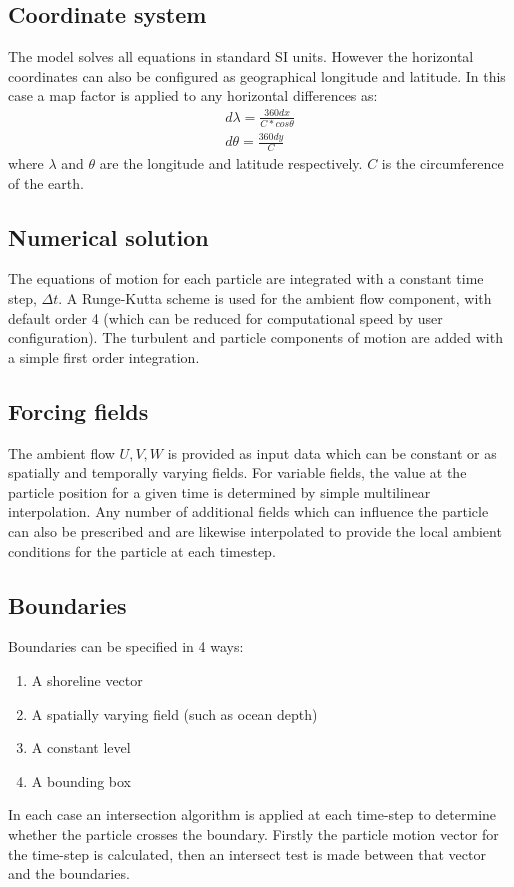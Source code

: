 \documentclass[a4paper]{article}
\begin{document}
\subsection{Coordinate system}
The model solves all equations in standard SI units.
However the horizontal coordinates can also be configured as geographical longitude and latitude.
In this case a map factor is applied to any horizontal differences as:
\begin{align}
d\lambda = \frac{360dx}{C*cos{\theta}} \\
d\theta = \frac{360dy}{C}
\end{align}
where $\lambda$ and $\theta$ are the longitude and latitude respectively. $C$ is the circumference of the earth.

\subsection{Numerical solution}
The equations of motion for each particle are integrated with a constant time step, $\Delta t$.
A Runge-Kutta scheme is used for the ambient flow component, with default order 4 (which can be reduced for computational speed by user configuration).
The turbulent and particle components of motion are added with a simple first order integration.

\subsection{Forcing fields}
The ambient flow $U,V,W$ is provided as input data which can be constant or as spatially and temporally varying fields.
For variable fields, the value at the particle position for a given time is determined by simple multilinear interpolation.
Any number of additional fields which can influence the particle can also be prescribed and are likewise interpolated to provide the local ambient conditions for the particle at each timestep.

\subsection{Boundaries}
Boundaries can be specified in 4 ways:
\begin{enumerate}
\item A shoreline vector
\item A spatially varying field (such as ocean depth) 
\item A constant level
\item A bounding box
\end{enumerate}
In each case an intersection algorithm is applied at each time-step to determine whether the particle crosses the boundary.
Firstly the particle motion vector for the time-step is calculated, then an intersect test is made between that vector and the boundaries.
\end{document}
